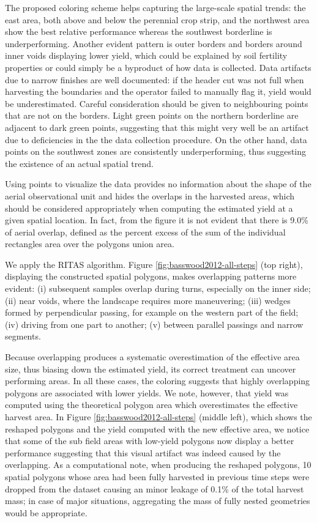  The proposed coloring scheme helps
capturing the large-scale spatial trends: the east area, both above
and below the perennial crop strip, and the northwest area show the
best relative performance whereas the southwest borderline is
underperforming. Another evident pattern is outer borders and borders
around inner voids displaying lower yield, which could be explained by
soil fertility properties or could simply be a byproduct of how data
is collected. Data artifacts due to narrow finishes are well
documented: if the header cut was not full when harvesting the
boundaries and the operator failed to manually flag it, yield would be
underestimated. Careful consideration should be given to neighbouring
points that are not on the borders. Light green points on the northern
borderline are adjacent to dark green points, suggesting that this
might very well be an artifact due to deficiencies in the the data
collection procedure. On the other hand, data points on the southwest
zones are consistently underperforming, thus suggesting the existence
of an actual spatial trend.

 Using points to visualize the data
provides no information about the shape of the aerial observational
unit and hides the overlaps in the harvested areas, which should be
considered appropriately when computing the estimated yield at a given
spatial location. In fact, from the figure it is not evident that
there is 9.0\% of aerial overlap, defined as the percent excess of the
sum of the individual rectangles area over the polygons union area.

 We apply the RITAS algorithm. Figure
\ref{fig:basswood2012-all-steps} (top right), displaying the
constructed spatial polygons, makes overlapping patterns more evident:
(i) subsequent samples overlap during turns, especially on the inner
side; (ii) near voids, where the landscape requires more maneuvering;
(iii) wedges formed by perpendicular passing, for example on the
western part of the field; (iv) driving from one part to another; (v)
between parallel passings and narrow segments.

 Because overlapping produces a systematic
overestimation of the effective area size, thus biasing down the
estimated yield, its correct treatment can uncover performing
areas. In all these cases, the coloring suggests that highly
overlapping polygons are associated with lower yields. We note,
however, that yield was computed using the theoretical polygon area
which overestimates the effective harvest area. In Figure
\ref{fig:basswood2012-all-steps} (middle left), which shows the
reshaped polygons and the yield computed with the new effective area,
we notice that some of the sub field areas with low-yield polygons now
display a better performance suggesting that this visual artifact was
indeed caused by the overlapping. As a computational note, when
producing the reshaped polygons, 10 spatial polygons whose area had
been fully harvested in previous time steps were dropped from the
dataset causing an minor leakage of 0.1\% of the total harvest mass;
in case of major situations, aggregating the mass of fully nested
geometries would be appropriate.

